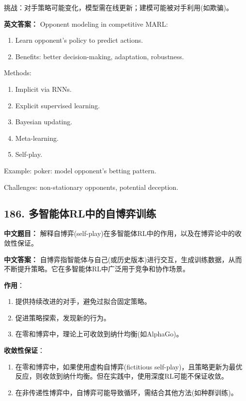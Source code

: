 \documentclass[10pt,a4paper]{ctexart}
\begin{document}
挑战：对手策略可能变化，模型需在线更新；建模可能被对手利用(如欺骗)。

\textbf{英文答案：}  
Opponent modeling in competitive MARL:
\begin{enumerate}
    \item Learn opponent's policy to predict actions.
    \item Benefits: better decision-making, adaptation, robustness.
\end{enumerate}

Methods:
\begin{enumerate}
    \item Implicit via RNNs.
    \item Explicit supervised learning.
    \item Bayesian updating.
    \item Meta-learning.
    \item Self-play.
\end{enumerate}

Example: poker: model opponent's betting pattern.

Challenges: non-stationary opponents, potential deception.

\subsection*{186. 多智能体RL中的自博弈训练}
\textbf{中文题目：} 解释自博弈(self-play)在多智能体RL中的作用，以及在博弈论中的收敛性保证。

\textbf{中文答案：}  
自博弈指智能体与自己(或历史版本)进行交互，生成训练数据，从而不断提升策略。它在多智能体RL中广泛用于竞争和协作场景。

\textbf{作用}：
\begin{enumerate}
    \item 提供持续改进的对手，避免过拟合固定策略。
    \item 促进策略探索，发现新的行为。
    \item 在零和博弈中，理论上可收敛到纳什均衡(如AlphaGo)。
\end{enumerate}

\textbf{收敛性保证}：
\begin{enumerate}
    \item 在零和博弈中，如果使用虚构自博弈(fictitious self-play)，且策略更新为最优反应，则收敛到纳什均衡。但在实践中，使用深度RL可能不保证收敛。
    \item 在非传递性博弈中，自博弈可能导致循环，需结合其他方法(如种群训练)。
\end{enumerate}
\end{document}
